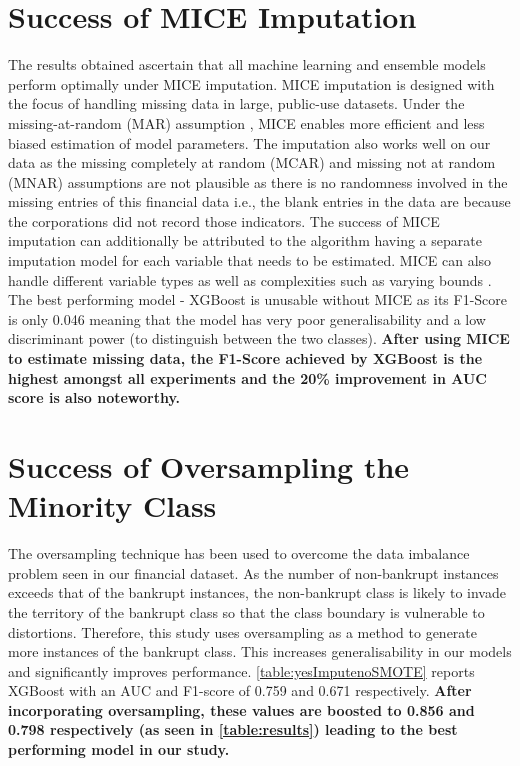 \label{chap:Discussion}
\section{Success of MICE Imputation}
The results obtained ascertain that all machine learning and ensemble models perform optimally under MICE imputation. 
MICE imputation is designed with the focus of handling missing data in large, public-use datasets. Under the missing-at-random (MAR) assumption \cite{little2019statistical}, MICE enables more efficient and less biased estimation of model parameters. The imputation also works well on our data as the missing completely at random (MCAR) and missing not at random (MNAR) assumptions are not plausible as there is no randomness involved in the missing entries of this financial data i.e., the blank entries in the data are because the corporations did not record those indicators.
The success of MICE imputation can additionally be attributed to the algorithm having a separate imputation model for each variable that needs to be estimated. MICE can also handle different variable types as well as complexities such as varying bounds \cite{wulff2017multiple}. The best performing model - XGBoost is unusable without MICE as its F1-Score is only 0.046 meaning that the model has very poor generalisability and a low discriminant power (to distinguish between the two classes). \textbf{After using MICE to estimate missing data, the F1-Score achieved by XGBoost is the highest amongst all experiments and the 20\% improvement in AUC score is also noteworthy.}

\section{Success of Oversampling the Minority Class}
The oversampling technique has been used to overcome the data imbalance problem seen in our financial dataset. As the number of non-bankrupt instances exceeds that of the bankrupt instances, the non-bankrupt class is likely to invade the territory of the bankrupt class so that the class boundary is vulnerable to distortions. 
Therefore, this study uses oversampling as a method to generate more instances of the bankrupt class. This increases generalisability in our models and significantly improves performance. \autoref{table:yesImputenoSMOTE} reports XGBoost with an AUC and F1-score of 0.759 and 0.671 respectively. \textbf{After incorporating oversampling, these values are boosted to 0.856 and 0.798 respectively (as seen in \autoref{table:results}) leading to the best performing model in our study.}

